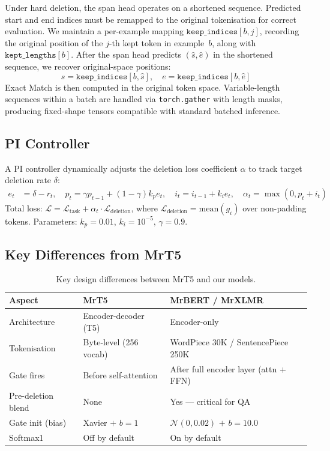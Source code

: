 \documentclass[11pt,a4paper]{article}
\begin{document}
Under hard deletion, the span head operates on a shortened sequence. Predicted start and end indices must be remapped to the original tokenisation for correct evaluation. We maintain a per-example mapping $\texttt{keep\_indices}[b,j]$, recording the original position of the $j$-th kept token in example~$b$, along with $\texttt{kept\_lengths}[b]$. After the span head predicts $(\hat{s},\hat{e})$ in the shortened sequence, we recover original-space positions:
\begin{equation}
    s = \texttt{keep\_indices}[b,\hat{s}], \quad e = \texttt{keep\_indices}[b,\hat{e}]
    \label{eq:span-remap}
\end{equation}
Exact Match is then computed in the original token space. Variable-length sequences within a batch are handled via \texttt{torch.gather} with length masks, producing fixed-shape tensors compatible with standard batched inference.


\subsection{PI Controller}
\label{sec:pi-controller}

A PI controller dynamically adjusts the deletion loss coefficient $\alpha$ to track target deletion rate $\delta$:
\begin{align}
    e_t &= \delta - r_t, \quad
    p_t = \gamma p_{t-1} + (1-\gamma)k_p e_t, \quad
    i_t = i_{t-1} + k_i e_t, \quad
    \alpha_t = \max(0, p_t+i_t)
\end{align}
Total loss: $\mathcal{L} = \mathcal{L}_{\text{task}} + \alpha_t\cdot\mathcal{L}_{\text{deletion}}$, where $\mathcal{L}_{\text{deletion}} = \text{mean}(g_i)$ over non-padding tokens. Parameters: $k_p=0.01$, $k_i=10^{-5}$, $\gamma=0.9$.


\subsection{Key Differences from MrT5}

\begin{table}[h]
\centering\small
\begin{tabular}{@{}lll@{}}
\toprule
\textbf{Aspect} & \textbf{MrT5} & \textbf{MrBERT / MrXLMR} \\
\midrule
Architecture       & Encoder-decoder (T5)    & Encoder-only \\
Tokenisation       & Byte-level (256 vocab)  & WordPiece 30K / SentencePiece 250K \\
Gate fires         & Before self-attention   & After full encoder layer (attn $+$ FFN) \\
Pre-deletion blend & None                    & Yes --- critical for QA \\
Gate init (bias)   & Xavier $+$ $b=1$        & $\mathcal{N}(0,0.02)$ $+$ $b=10.0$ \\
Softmax1           & Off by default          & On by default \\
\bottomrule
\end{tabular}
\caption{Key design differences between MrT5 and our models.}
\label{tab:diff-mrt5}
\end{table}
\end{document}
